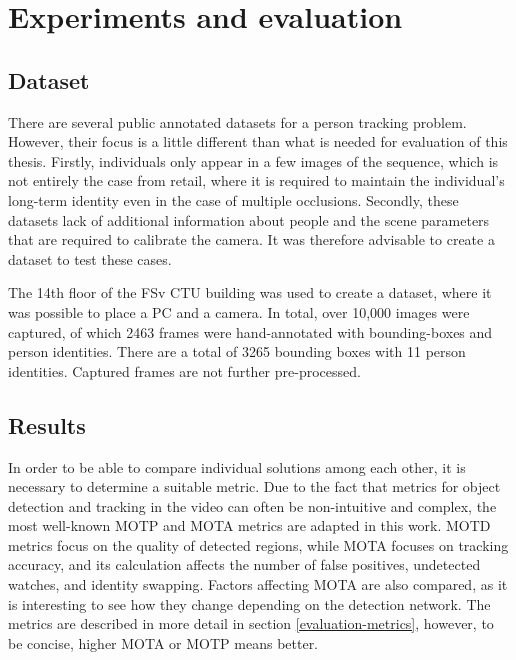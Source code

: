 \chapter{Experiments and evaluation}

\section{Dataset}
    There are several public annotated datasets \cite{ferryman2009pets2009, MOTChallenge2015, zhuvisdrone2018} for a person tracking problem. However, their focus is a little different than what is needed for evaluation of this thesis. Firstly,  
    individuals only appear in a few images of the sequence, which is not entirely the case from retail, where it is required to maintain the individual's long-term identity even in the case of multiple occlusions. Secondly, these datasets lack of additional information about people and the scene parameters that are required to calibrate the camera. It was therefore advisable to create a dataset to test these cases.
    
    The 14th floor of the FSv CTU building was used to create a dataset, where it was possible to place a PC and a camera. In total, over 10,000 images were captured, of which 2463 frames were hand-annotated with bounding-boxes and person identities. There are a total of 3265 bounding boxes with 11 person identities. Captured frames are not further pre-processed.
  
\section{Results}
    In order to be able to compare individual solutions among each other, it is necessary to determine a suitable metric. Due to the fact that metrics for object detection and tracking in the video can often be non-intuitive and complex, the most well-known MOTP and MOTA metrics are adapted in this work. MOTD metrics focus on the quality of detected regions, while MOTA focuses on tracking accuracy, and its calculation affects the number of false positives, undetected watches, and identity swapping. Factors affecting MOTA are also compared, as it is interesting to see how they change depending on the detection network. The metrics are described in more detail in section \ref{evaluation-metrics}, however, to be concise, higher MOTA or MOTP means better.
    



